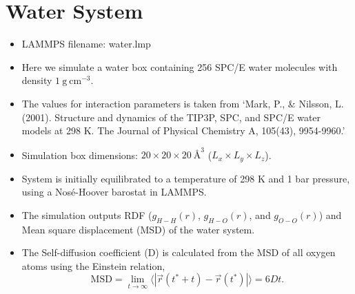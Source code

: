\documentclass[12pt]{article}
\begin{document}
\newpage
\section{Water System}
\begin{itemize}
\item LAMMPS filename: water.lmp
\item Here we simulate a water box containing 256 SPC/E water molecules with 
density $1 \ \textrm{g} \ \textrm{cm}^{-3}$.
\item The values for interaction parameters is taken from 
`Mark, P., \& Nilsson, L. (2001). Structure and dynamics of the TIP3P, SPC, and SPC/E water models at 298 K. The Journal of Physical Chemistry A, 105(43), 9954-9960.'
\item Simulation box dimensions: $20 \times 20 \times 20 \ \textrm{\AA}^{3}$ 
($L_{x} \times L_{y} \times L_{z}$).
\item System is initially equilibrated to a temperature of 298 K and 1 bar pressure, 
using a Nos\'e-Hoover barostat in LAMMPS.
\item The simulation outputs RDF ($g_{H-H}(r)$, $g_{H-O}(r)$, and $g_{O-O}(r)$) and 
Mean square displacement (MSD) of the water system.
\item The Self-diffusion coefficient (D) is calculated from the MSD of all oxygen 
atoms using the Einstein relation,
$$\textrm{MSD} = \lim_{t\to\infty}\langle |\vec{r}(t^{*}+t) - \vec{r}(t^{*})|\rangle = 6Dt.$$
\end{itemize}
\end{document}
